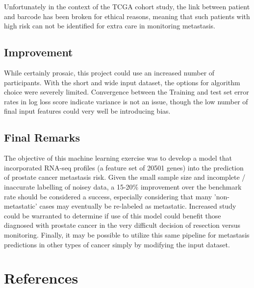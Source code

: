 \documentclass[final]{article}
\begin{document}
Unfortunately in the context of the TCGA cohort study, the link between patient
and barcode has been broken for ethical reasons, meaning that such patients with
high risk can not be identified for extra care in monitoring metastasis.

\subsection{Improvement}

While certainly prosaic, this project could use an increased number of participants.
With the short and wide input dataset, the options for algorithm choice were severely
limited.  Convergence between the Training and test set error rates in log loss
score indicate variance is not an issue, though the low number of final input features
could very well be introducing bias.

\subsection{Final Remarks}

The objective of this machine learning exercise was to develop a model that
incorporated RNA-seq profiles (a feature set of 20501 genes) into the
prediction of prostate cancer metastasis risk.  Given the small sample size and
incomplete / inaccurate labelling of noisey data, a 15-20\% improvement over the
benchmark rate should be  considered a success, especially considering that many
'non-metastatic' cases may eventually be re-labeled as metastatic.  Increased study could
be warranted to  determine if use of this model could benefit those diagnosed
with prostate cancer in the very difficult decision of resection versus
monitoring.  Finally, it may be possible to utilize this same pipeline for
metastasis predictions in other types of cancer simply by modifying the input dataset.

\section{References}
\end{document}
